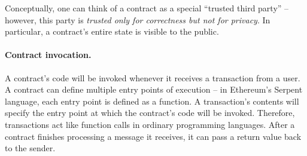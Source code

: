 \documentclass{llncs}
\newcommand{\ignore}[1]{}
\begin{document}



Conceptually, one can think of a contract as 
a special ``trusted third party'' -- however,
this party is {\it trusted only for correctness but not for privacy}.
In particular, a contract's entire state is 
visible to the public.

\paragraph{Contract invocation.} 
A contract's code will be invoked 
whenever it receives a transaction from a user.
A contract can define multiple entry points
of execution -- in Ethereum's Serpent language,
each entry point is defined as a function.
A transaction's contents
will specify the entry point 
at which the contract's code will be invoked.
Therefore, transactions act like function calls in ordinary programming languages. 
After a contract finishes processing a message it receives, it can pass a return value back to the sender.






\ignore{
\paragraph{Transactions, Messages and Gas.}
A transaction always begins with a message from a user to some recipient address (either another user or a contract). This message must be signed by the user, and can contain data, ether, or both. If the recipient is a contract, then the code of that contract is executed. If that code contains an instruction to send a message to another contract, then that contract's code is executed next. So, a transaction must contain at least one message, but can trigger several messages before it completes.

Messages act a bit like function calls in ordinary programming languages. After a contract finishes processing a message it receives, it can pass a return value back to the sender.

In some cases, a contract can encounter an ``exception'' (e.g., because of an invalid instruction). After an exception, control is also returned to the sender along with a special return code. The state of \emph{all} contract, including account balances and storage, is reverted to what it was just prior to calling the exception-causing message.
}
\end{document}
